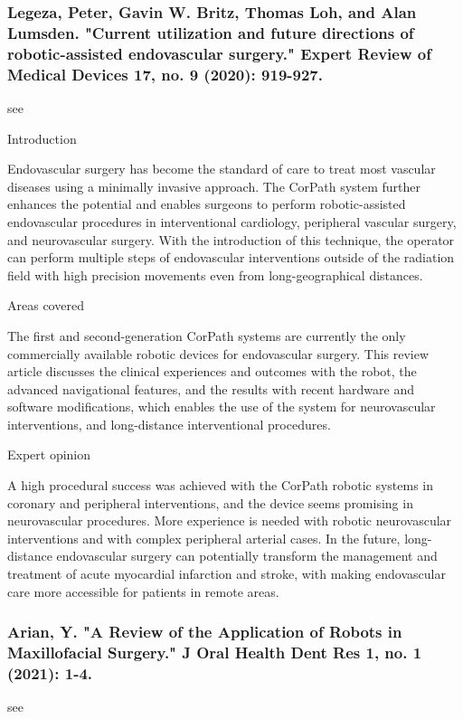 \documentclass[conference]{IEEEtran}
\begin{document}
\medskip
\subsubsection{Legeza, Peter, Gavin W. Britz, Thomas Loh, and Alan Lumsden. "Current utilization and future directions of robotic-assisted endovascular surgery." Expert Review of Medical Devices 17, no. 9 (2020): 919-927.}
see \cite{legeza2020current}

Introduction

Endovascular surgery has become the standard of care to treat most vascular diseases using a minimally invasive approach. The CorPath system further enhances the potential and enables surgeons to perform robotic-assisted endovascular procedures in interventional cardiology, peripheral vascular surgery, and neurovascular surgery. With the introduction of this technique, the operator can perform multiple steps of endovascular interventions outside of the radiation field with high precision movements even from long-geographical distances.

Areas covered

The first and second-generation CorPath systems are currently the only commercially available robotic devices for endovascular surgery. This review article discusses the clinical experiences and outcomes with the robot, the advanced navigational features, and the results with recent hardware and software modifications, which enables the use of the system for neurovascular interventions, and long-distance interventional procedures.

Expert opinion

A high procedural success was achieved with the CorPath robotic systems in coronary and peripheral interventions, and the device seems promising in neurovascular procedures. More experience is needed with robotic neurovascular interventions and with complex peripheral arterial cases. In the future, long-distance endovascular surgery can potentially transform the management and treatment of acute myocardial infarction and stroke, with making endovascular care more accessible for patients in remote areas.

\medskip
\subsubsection{Arian, Y. "A Review of the Application of Robots in Maxillofacial Surgery." J Oral Health Dent Res 1, no. 1 (2021): 1-4.}
see \cite{arian2021review}
\end{document}
